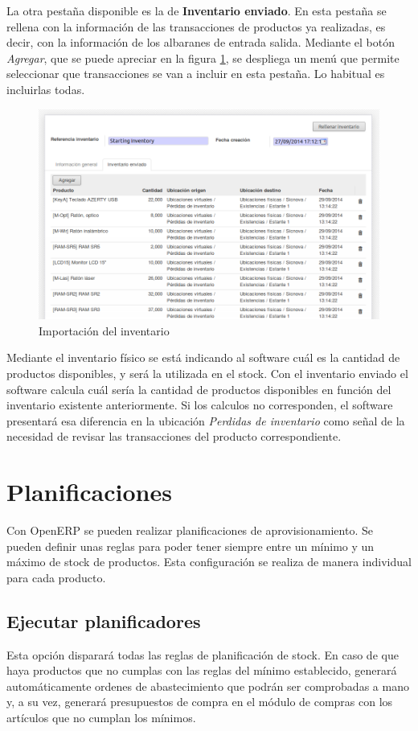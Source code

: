 La otra pestaña disponible es la de \textbf{Inventario enviado}. En esta pestaña se rellena con la información de las transacciones de productos
ya realizadas, es decir, con la información de los albaranes de entrada salida. Mediante el botón \emph{Agregar}, que se puede apreciar en la
figura \ref{ub:inventarioenviado}, se despliega un menú que permite seleccionar que transacciones se van a incluir en esta pestaña. Lo habitual es
incluirlas todas.

\begin{figure}[H]
\includegraphics[width=\textwidth]{almacen/img/inv_env.png}
\caption{Importación del inventario}
\label{ub:inventarioenviado}
\end{figure}

Mediante el inventario físico se está indicando al software cuál es la cantidad de productos disponibles, y será la utilizada en el stock.
Con el inventario enviado el software calcula cuál sería la cantidad de productos disponibles en función del inventario existente anteriormente.
Si los calculos no corresponden, el software presentará esa diferencia en la ubicación \emph{Perdidas de inventario} como señal de la necesidad
de revisar las transacciones del producto correspondiente.




\section{Planificaciones}
Con OpenERP se pueden realizar planificaciones de aprovisionamiento. Se pueden definir unas reglas para poder tener siempre entre un mínimo y
un máximo de stock de productos. Esta configuración se realiza de manera individual para cada producto.

\subsection{Ejecutar planificadores}
Esta opción disparará todas las reglas de planificación de stock. En caso de que haya productos que no cumplas con las reglas del mínimo
establecido, generará automáticamente ordenes de abastecimiento que podrán ser comprobadas a mano y, a su vez, generará presupuestos de compra
en el módulo de compras con los artículos que no cumplan los mínimos.

